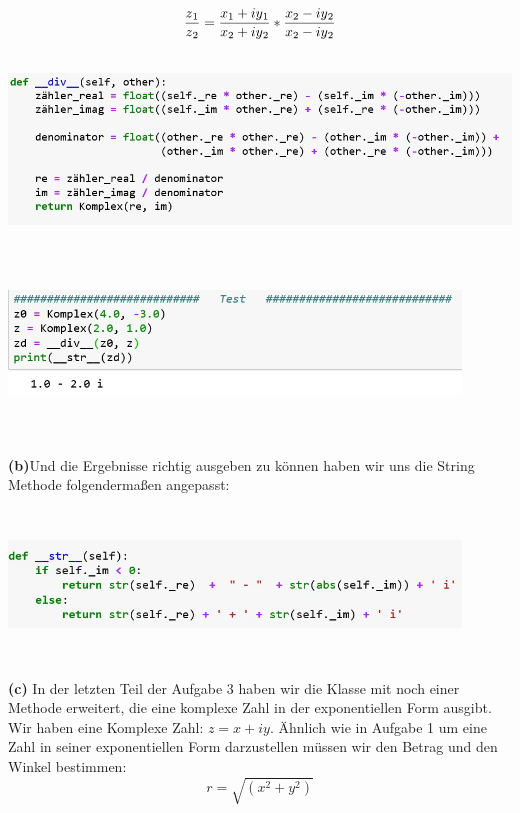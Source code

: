 \documentclass[12pt,oneside,a4paper]{article}
\begin{document}
\begin{flushleft}
$$\frac{z\textsubscript{1}}{ z\textsubscript{2}} = \frac{x\textsubscript{1} + iy\textsubscript{1}}{ x\textsubscript{2} + iy\textsubscript{2}} * \frac{x\textsubscript{2} - iy\textsubscript{2}}{x\textsubscript{2} - iy\textsubscript{2}} $$
\bigskip
\begin{center}
\includegraphics[width=17cm,height=5cm]{Div}
\includegraphics[width=12cm,height=5cm]{Div2}
\end{center}
\bigskip
\textbf{(b)}Und die Ergebnisse richtig ausgeben zu können haben wir uns die String Methode folgendermaßen angepasst: 
\begin{center}
\includegraphics[width=12cm,height=4cm]{String}  
\bigskip
\end{center}
\textbf{(c)} In der letzten Teil der Aufgabe 3 haben wir die Klasse mit noch einer Methode erweitert, die eine komplexe Zahl in der exponentiellen Form ausgibt.\\
Wir haben eine Komplexe Zahl: $z = x + iy$.
Ähnlich wie in Aufgabe 1 um eine Zahl in seiner exponentiellen Form darzustellen müssen wir den Betrag und den Winkel bestimmen: $$r = \sqrt{(x^2 + y^2)}$$ \\ 

\end{flushleft}
\end{document}
